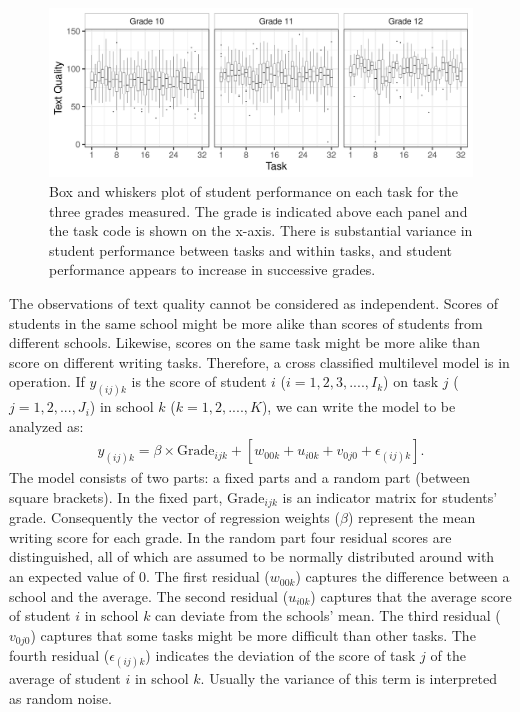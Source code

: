 \documentclass[a4paper]{article}
\begin{document}
\begin{figure}[!ht]
	\includegraphics[width=\textwidth]{figures/descriptivesBaseline.pdf}
	\caption{Box and whiskers plot of student performance on each task for the three grades measured. The grade is indicated above each panel and the task code is shown on the x-axis. There is substantial variance in student performance between tasks and within tasks, and student performance appears to increase in successive grades.}
	\label{fig:baselineDescriptives}
\end{figure}
The observations of text quality cannot be considered as independent. Scores of students in the same school might be more alike than scores of students from different schools. Likewise, scores on the same task might be more alike than score on different writing tasks. Therefore, a cross classified multilevel model is in operation. If $y_{(ij)k}$ is the score of student $i$ ($i = 1, 2, 3, ...., I_k$) on task $j$ ($j = 1, 2, ..., J_i$) in school $k$ ($k = 1, 2, ...., K$), we can write the model to be analyzed as:
\begin{align*}
	y_{(ij)k} = \beta \times \mathrm{Grade}_{ijk} + [w_{00k} + u_{i0k} + v_{0j0} + \epsilon_{(ij)k}].
\end{align*}
The model consists of two parts: a fixed parts and a random part (between square brackets). In the fixed part, $\mathrm{Grade}_{ijk}$ is an indicator matrix for students' grade. Consequently the vector of regression weights ($\beta$) represent the mean writing score for each grade. In the random part four residual scores are distinguished, all of which are assumed to be normally distributed around with an expected value of 0. The first residual ($w_{00k}$) captures the difference between a school and the average. The second residual ($u_{i0k}$) captures that the average score of student $i$ in school $k$ can deviate from the schools' mean. The third residual ($v_{0j0}$) captures that some tasks might be more difficult than other tasks. The fourth residual ($\epsilon_{(ij)k}$) indicates the deviation of the score of task $j$ of the average of student $i$ in school $k$. Usually the variance of this term is interpreted as random noise.
\end{document}
